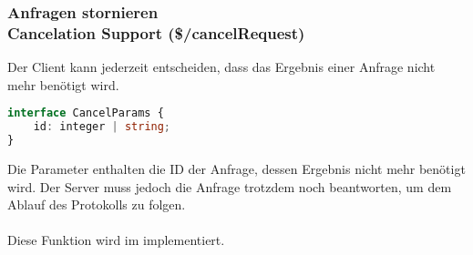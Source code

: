 \documentclass[./einleitung.tex]{subfiles}
\begin{document}
    \subsubsection[Anfragen stornieren]{Anfragen stornieren\\ {\textnormal{\footnotesize Cancelation Support (\$/cancelRequest) \cite{cancelation}}}} \label{subsubsec:cancel}
    Der Client kann jederzeit entscheiden, dass das Ergebnis einer Anfrage nicht mehr benötigt wird.
    \begin{lstlisting}[language=Typescript,title=Definition der Parameter \cite{cancelation},label={lst:cancelParams}]
interface CancelParams {
	id: integer | string;
}
    \end{lstlisting}
    Die Parameter enthalten die ID der Anfrage, dessen Ergebnis nicht mehr benötigt wird.
    Der Server muss jedoch die Anfrage trotzdem noch beantworten, um dem Ablauf des Protokolls zu folgen.
    \\\\
    Diese Funktion wird im  implementiert.
\end{document}

